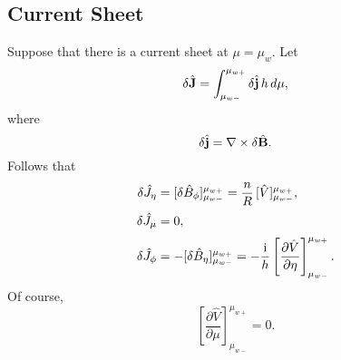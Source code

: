 \documentclass[12pt,prb,aps,notitlepage]{revtex4-1}
\begin{document}
\subsection{Current Sheet}
Suppose that there is a current sheet at $\mu=\mu_w$. Let
\begin{equation}
\delta\hat{\bf J} = \int_{\mu_{w-}}^{\mu_{w+}}\delta\hat{\bf j}\,h\,d\mu,
\end{equation}
where
\begin{equation}
\delta\hat{\bf j} = \nabla\times \delta\hat{\bf B}.
\end{equation}
Follows that
\begin{align}
\delta\hat{J}_\eta &= [\delta \hat{B}_\phi]_{\mu_{w-}}^{\mu_{w+}} = \frac{n}{R}\,[\hat{V}]_{\mu_{w-}}^{\mu_{w+}},\\[0.5ex]
\delta\hat{J}_\mu &=0,\\[0.5ex]
\delta\hat{J}_\phi &=  -[\delta \hat{B}_\eta]_{\mu_{w-}}^{\mu_{w+}} =- \frac{{\rm i}}{h}\left[\frac{\partial\hat{V}}{\partial\eta}\right]_{\mu_{w-}}^{\mu_{w+}}.
\end{align}
Of course,
\begin{equation}
\left[\frac{\partial\hat{V}}{\partial\mu}\right]_{\mu_{w-}}^{\mu_{w+}}=0.
\end{equation}
\end{document}
